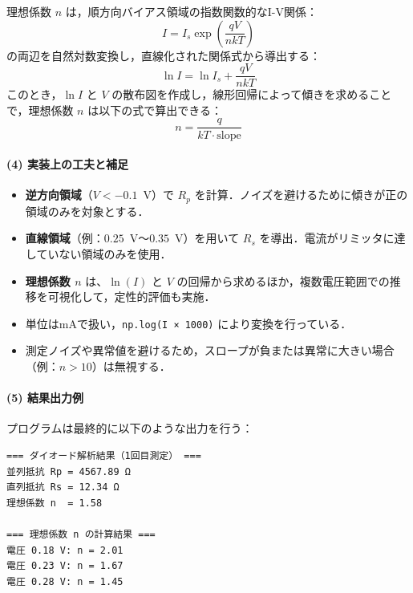 理想係数 \( n \) は，順方向バイアス領域の指数関数的なI-V関係：
\begin{equation}
    I = I_s \exp\left( \frac{qV}{nkT} \right)
\end{equation}
の両辺を自然対数変換し，直線化された関係式から導出する：
\begin{equation}
    \ln I = \ln I_s + \frac{qV}{nkT}
\end{equation}
このとき，\( \ln I \) と \( V \) の散布図を作成し，線形回帰によって傾きを求めることで，理想係数 \( n \) は以下の式で算出できる：
\begin{equation}
    n = \frac{q}{kT \cdot \text{slope}}
\end{equation}

\vspace{1em}
\paragraph{(4) 実装上の工夫と補足}

\begin{itemize}
    \item \textbf{逆方向領域}（$V < -0.1$~V）で \( R_p \) を計算．ノイズを避けるために傾きが正の領域のみを対象とする．
    \item \textbf{直線領域}（例：$0.25$~V〜$0.35$~V）を用いて \( R_s \) を導出．電流がリミッタに達していない領域のみを使用．
    \item \textbf{理想係数 \( n \)} は、$\ln(I)$ と $V$ の回帰から求めるほか，複数電圧範囲での推移を可視化して，定性的評価も実施．
    \item 単位はmAで扱い，\texttt{np.log(I × 1000)} により変換を行っている．
    \item 測定ノイズや異常値を避けるため，スロープが負または異常に大きい場合（例：$n > 10$）は無視する．
\end{itemize}

\vspace{1em}
\paragraph{(5) 結果出力例}

プログラムは最終的に以下のような出力を行う：

\begin{verbatim}
=== ダイオード解析結果（1回目測定） ===
並列抵抗 Rp = 4567.89 Ω
直列抵抗 Rs = 12.34 Ω
理想係数 n  = 1.58

=== 理想係数 n の計算結果 ===
電圧 0.18 V: n = 2.01
電圧 0.23 V: n = 1.67
電圧 0.28 V: n = 1.45
\end{verbatim}

